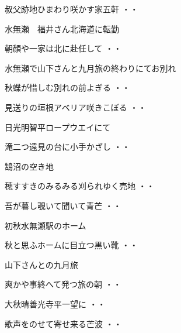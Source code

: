 \begin{shiika}叔父跡地ひまわり咲かす家五軒
\hfill{・・}\end{shiika}
\vspace{0.6cm}
水無瀬　福井さん北海道に転勤
\begin{shiika}朝顔や一家は北に赴任して
\hfill{・・}\end{shiika}
\vspace{0.6cm}
水無瀬で山下さんと九月旅の終わりにてお別れ
\begin{shiika}秋蝶が惜しむ別れの前よぎる
\hfill{・・}\end{shiika}
\vspace{0.6cm}
\begin{shiika}見送りの垣根アベリア咲きこぼる
\hfill{・・}\end{shiika}
\vspace{0.6cm}
日光明智平ロープウエイにて
\begin{shiika}滝二つ遠見の台に小手かざし
\hfill{・・}\end{shiika}
\vspace{0.6cm}
鵠沼の空き地
\begin{shiika}穂すすきのみるみる刈られゆく売地
\hfill{・・}\end{shiika}
\begin{shiika}吾が暮し覗いて聞いて青芒
\hfill{・・}\end{shiika}
\vspace{0.6cm}
初秋水無瀬駅のホーム
\begin{shiika}秋と思ふホームに目立つ黒い靴
\hfill{・・}\end{shiika}
\vspace{0.6cm}
山下さんとの九月旅
\begin{shiika}爽かや事終へて発つ旅の朝
\hfill{・・}\end{shiika}
\begin{shiika}大秋晴善光寺平一望に
\hfill{・・}\end{shiika}
\begin{shiika}歌声をのせて寄せ来る芒波
\hfill{・・}\end{shiika}
\vspace{0.6cm}
